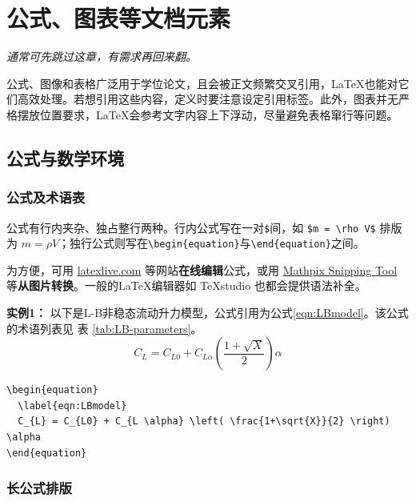 \chapter{公式、图表等文档元素}
\label{chap:example}

\textit{
通常可先跳过这章，有需求再回来翻。
}

公式、图像和表格广泛用于学位论文，且会被正文频繁交叉引用，\LaTeX{}也能对它们高效处理。若想引用这些内容，定义时要注意设定引用标签。此外，图表并无严格摆放位置要求，\LaTeX{}会参考文字内容上下浮动，尽量避免表格窜行等问题。

\section{公式与数学环境}

\subsection{公式及术语表}
\label{sec:eqn}

公式有行内夹杂、独占整行两种。行内公式写在一对\verb|$|间，如 \verb|$m = \rho V$| 排版为 $m = \rho V$；独行公式则写在\verb|\begin{equation}|与\verb|\end{equation}|之间。

为方便，可用 \href{https://www.latexlive.com/}{latexlive.com} 等网站\textbf{在线编辑}公式，或用 \href{https://mathpix.com/snipping-tool}{Mathpix Snipping Tool} 等\textbf{从图片转换}。一般的\LaTeX{}编辑器如 TeXstudio 也都会提供语法补全。

{\bf{实例1：}} 以下是L-B非稳态流动升力模型，公式引用为公式\ref{eqn:LBmodel}。该公式的术语列表见 表 \ref{tab:LB-parameters}。
\begin{equation}
  \label{eqn:LBmodel}
  C_{L} = C_{L0} + C_{L \alpha} \left( \frac{1+\sqrt{X}}{2} \right) \alpha 
\end{equation}

\begin{lstlisting}[language={[LaTeX]TeX}, caption={L-B非稳态流动升力模型}]
\begin{equation}
  \label{eqn:LBmodel}
  C_{L} = C_{L0} + C_{L \alpha} \left( \frac{1+\sqrt{X}}{2} \right) \alpha 
\end{equation}
\end{lstlisting}

\subsection{长公式排版}



